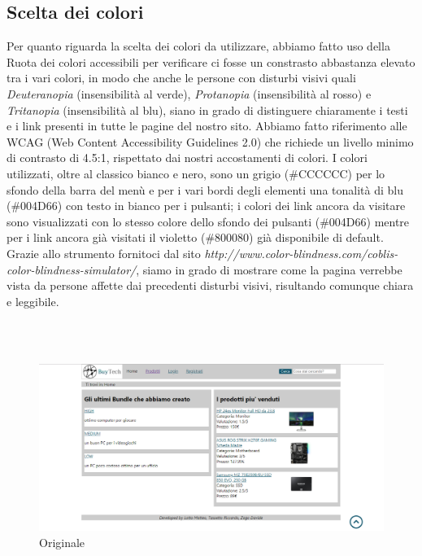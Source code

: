 \subsection{Scelta dei colori}
Per quanto riguarda la scelta dei colori da utilizzare, abbiamo fatto uso della Ruota dei colori accessibili per verificare ci fosse un constrasto abbastanza elevato tra i vari colori, in modo che anche le persone con disturbi visivi quali \emph{Deuteranopia} (insensibilità al verde), \emph{Protanopia} (insensibilità al rosso) e \emph{Tritanopia} (insensibilità al blu), siano in grado di distinguere chiaramente i testi e i link presenti in tutte le pagine del nostro sito.\newline
Abbiamo fatto riferimento alle WCAG (Web Content Accessibility Guidelines 2.0) che richiede un livello minimo di contrasto di 4.5:1, rispettato dai nostri accostamenti di colori.\newline
I colori utilizzati, oltre al classico bianco e nero, sono un grigio (\#CCCCCC) per lo sfondo della barra del menù e per i vari bordi degli elementi una tonalità di blu (\#004D66) con testo in bianco per i pulsanti; i colori dei link ancora da visitare sono visualizzati con lo stesso colore dello sfondo dei pulsanti (\#004D66) mentre per i link ancora già visitati il violetto (\#800080) già disponibile di default.
Grazie allo strumento fornitoci dal sito \emph{http://www.color-blindness.com/coblis-color-blindness-simulator/}, siamo in grado di mostrare come la pagina verrebbe vista da persone affette dai precedenti disturbi visivi, risultando comunque chiara e leggibile.\newline


\mbox{} \\ \mbox{} \\ \Spazio

\begin{figure}[h]
	\label{originale}
	\centering %
	\includegraphics[width=1\textwidth]{immagini/screenhome.png}
	\caption{Originale} %
\end{figure}



